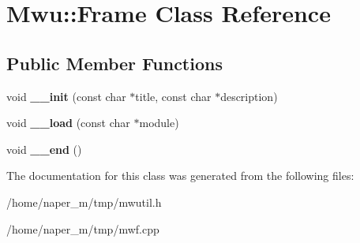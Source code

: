 \hypertarget{class_mwu_1_1_frame}{\section{Mwu\-:\-:Frame Class Reference}
\label{class_mwu_1_1_frame}
}
\subsection*{Public Member Functions}
\begin{DoxyCompactItemize}
\item 
\hypertarget{class_mwu_1_1_frame_ad2db0ac7e96de99ac4e41ad0828cb15c}{void {\bfseries \-\_\-\-\_\-init} (const char $\ast$title, const char $\ast$description)}\label{class_mwu_1_1_frame_ad2db0ac7e96de99ac4e41ad0828cb15c}

\item 
\hypertarget{class_mwu_1_1_frame_aabdcd468ba3cc489041581239ca36a10}{void {\bfseries \-\_\-\-\_\-load} (const char $\ast$module)}\label{class_mwu_1_1_frame_aabdcd468ba3cc489041581239ca36a10}

\item 
\hypertarget{class_mwu_1_1_frame_ac077662528428faf1d98f63b484d464d}{void {\bfseries \-\_\-\-\_\-end} ()}\label{class_mwu_1_1_frame_ac077662528428faf1d98f63b484d464d}

\end{DoxyCompactItemize}


The documentation for this class was generated from the following files\-:\begin{DoxyCompactItemize}
\item 
/home/naper\-\_\-m/tmp/mwutil.\-h\item 
/home/naper\-\_\-m/tmp/mwf.\-cpp\end{DoxyCompactItemize}
